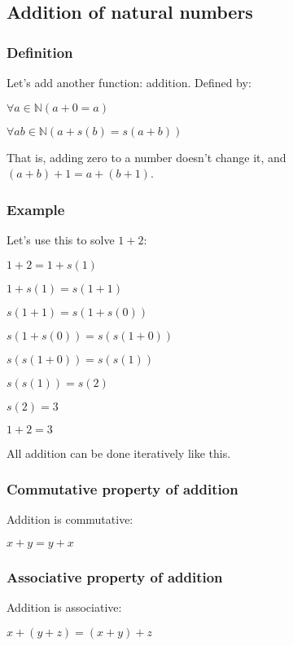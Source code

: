 \subsection{Addition of natural numbers}


\subsubsection{Definition}
Let’s add another function: addition. Defined by:

$\forall a \in \mathbb{N} (a+0=a)$

$\forall a b \in \mathbb{N} (a+s(b)=s(a+b))$

That is, adding zero to a number doesn’t change it, and \((a+b)+1=a+(b+1)\).

\subsubsection{Example}

Let’s use this to solve \(1+2\):

$1+2=1+s(1)$

$1+s(1)=s(1+1)$

$s(1+1)=s(1+s(0))$

$s(1+s(0))=s(s(1+0))$

$s(s(1+0))=s(s(1))$

$s(s(1))=s(2)$

$s(2)=3$

$1+2=3$

All addition can be done iteratively like this.

\subsubsection{Commutative property of addition}

Addition is commutative:

$x+y=y+x$

\subsubsection{Associative property of addition}

Addition is associative:

$x+(y+z)=(x+y)+z$

